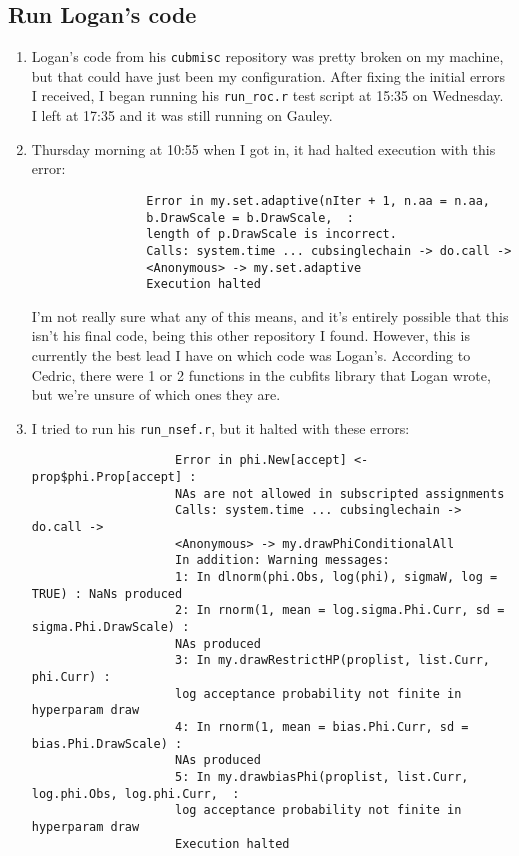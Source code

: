 \documentclass[12 pt]{article}
\begin{document}
		\subsection{Run Logan's code}
			\begin{enumerate}
				\item Logan's code from his \texttt{cubmisc} repository was pretty broken on my machine, but that could have just been my configuration. After fixing the initial errors I received, I began running his \texttt{run\_roc.r} test script at 15:35 on Wednesday. I left at 17:35 and it was still running on Gauley.
				\item Thursday morning at 10:55 when I got in, it had halted execution with this error:
				\begin{verbatim}
				Error in my.set.adaptive(nIter + 1, n.aa = n.aa, 
				b.DrawScale = b.DrawScale,  : 
				length of p.DrawScale is incorrect.
				Calls: system.time ... cubsinglechain -> do.call -> 
				<Anonymous> -> my.set.adaptive
				Execution halted
				\end{verbatim}
				
				I'm not really sure what any of this means, and it's entirely possible that this isn't his final code, being this other repository I found. However, this is currently the best lead I have on which code was Logan's. According to Cedric, there were 1 or 2 functions in the cubfits library that Logan wrote, but we're unsure of which ones they are.
				
				\item I tried to run his \texttt{run\_nsef.r}, but it halted with these errors:
				\begin{verbatim}
					Error in phi.New[accept] <- prop$phi.Prop[accept] : 
					NAs are not allowed in subscripted assignments
					Calls: system.time ... cubsinglechain -> do.call -> 
					<Anonymous> -> my.drawPhiConditionalAll
					In addition: Warning messages:
					1: In dlnorm(phi.Obs, log(phi), sigmaW, log = TRUE) : NaNs produced
					2: In rnorm(1, mean = log.sigma.Phi.Curr, sd = sigma.Phi.DrawScale) :
					NAs produced
					3: In my.drawRestrictHP(proplist, list.Curr, phi.Curr) :
					log acceptance probability not finite in hyperparam draw
					4: In rnorm(1, mean = bias.Phi.Curr, sd = bias.Phi.DrawScale) :
					NAs produced
					5: In my.drawbiasPhi(proplist, list.Curr, log.phi.Obs, log.phi.Curr,  :
					log acceptance probability not finite in hyperparam draw
					Execution halted
				\end{verbatim}
			\end{enumerate}
\end{document}
